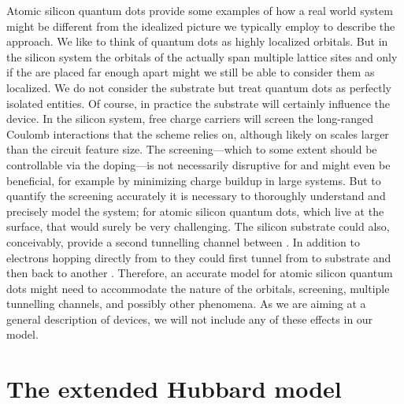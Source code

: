 Atomic silicon quantum dots provide some examples of how a real world system
might be different from the idealized picture we typically employ to describe
the  approach. We like to think of quantum dots as highly localized
orbitals. But in the silicon system the orbitals of the  actually
span multiple lattice sites and only if the  are placed far enough
apart might we still be able to consider them as localized. We do not consider
the substrate but treat quantum dots as perfectly isolated entities. Of course,
in practice the substrate will certainly influence the  device. In the
silicon system, free charge carriers will screen the long-ranged Coulomb
interactions that the  scheme relies on, although likely on scales
larger than the circuit feature size. The screening---which to some extent
should be controllable via the doping---is not necessarily disruptive for
 and might even be beneficial, for example by minimizing charge
buildup in large systems. But to quantify the screening accurately it is
necessary to thoroughly understand and precisely model the system; for atomic
silicon quantum dots, which live at the surface, that would surely be very
challenging. The silicon substrate could also, conceivably, provide a second
tunnelling channel between . In addition to electrons hopping
directly from  to  they could first tunnel from  to
substrate and then back to another . Therefore, an accurate model for
atomic silicon quantum dots might need to accommodate the nature of the
 orbitals, screening, multiple tunnelling channels, and possibly other
phenomena. As we are aiming at a general description of  devices, we
will not include any of these effects in our model.


\section{The extended Hubbard model}

